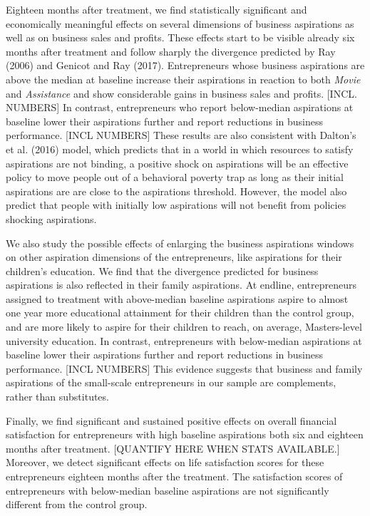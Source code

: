 \documentclass[11.5pt]{article}
\begin{document}
Eighteen months after treatment, we find statistically significant and economically meaningful effects on several dimensions of business aspirations as well as on business sales and profits. These effects start to be visible already six months after treatment and follow sharply the divergence predicted by Ray (2006) and Genicot and Ray (2017). Entrepreneurs whose business aspirations are above the median at baseline increase their aspirations in reaction to both \emph{Movie} and \emph{Assistance} and show considerable gains in business sales and profits. [INCL. NUMBERS] In contrast, entrepreneurs who report below-median aspirations at baseline lower their aspirations further and report reductions in business performance. [INCL NUMBERS] These results are also consistent with Dalton's et al. (2016) model, which predicts that in a world in which resources to satisfy aspirations are not binding, a positive shock on aspirations will be an effective policy to move people out of a behavioral poverty trap as long as their initial aspirations are are close to the aspirations threshold. However, the model also predict that people with initially low aspirations will not benefit from policies shocking aspirations.

We also study the possible effects of enlarging the business aspirations windows on other aspiration dimensions of the entrepreneurs, like aspirations for their children's education. We find that the divergence predicted for business aspirations is also reflected in their family aspirations. At endline, entrepreneurs assigned to treatment with above-median baseline aspirations aspire to almost one year more educational attainment for their children than the control group, and are more likely to aspire for their children to reach, on average, Masters-level university education. In contrast, entrepreneurs with below-median aspirations at baseline lower their aspirations further and report reductions in business performance. [INCL NUMBERS] This evidence suggests that business and family aspirations of the small-scale entrepreneurs in our sample are complements, rather than substitutes.

Finally, we find significant and sustained positive effects on overall financial satisfaction for entrepreneurs with high baseline aspirations both six and eighteen months after treatment. [QUANTIFY HERE WHEN STATS AVAILABLE.] Moreover, we detect significant effects on life satisfaction scores for these entrepreneurs eighteen months after the treatment. The satisfaction scores of entrepreneurs with below-median baseline aspirations are not significantly different from the control group.
\end{document}
